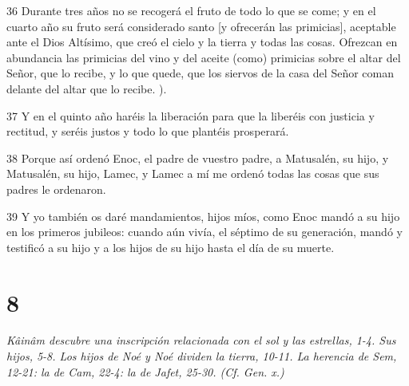 \par 36 Durante tres años no se recogerá el fruto de todo lo que se come; y en el cuarto año su fruto será considerado santo [y ofrecerán las primicias], aceptable ante el Dios Altísimo, que creó el cielo y la tierra y todas las cosas. Ofrezcan en abundancia las primicias del vino y del aceite (como) primicias sobre el altar del Señor, que lo recibe, y lo que quede, que los siervos de la casa del Señor coman delante del altar que lo recibe. ).
\par 37 Y en el quinto año haréis la liberación para que la liberéis con justicia y rectitud, y seréis justos y todo lo que plantéis prosperará.
\par 38 Porque así ordenó Enoc, el padre de vuestro padre, a Matusalén, su hijo, y Matusalén, su hijo, Lamec, y Lamec a mí me ordenó todas las cosas que sus padres le ordenaron.
\par 39 Y yo también os daré mandamientos, hijos míos, como Enoc mandó a su hijo en los primeros jubileos: cuando aún vivía, el séptimo de su generación, mandó y testificó a su hijo y a los hijos de su hijo hasta el día de su muerte.

\chapter{8}

\par \textit{Kâinâm descubre una inscripción relacionada con el sol y las estrellas, 1-4. Sus hijos, 5-8. Los hijos de Noé y Noé dividen la tierra, 10-11. La herencia de Sem, 12-21: la de Cam, 22-4: la de Jafet, 25-30. (Cf. Gen. x.)}

